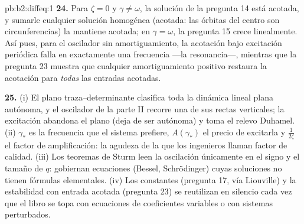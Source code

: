 \begin{solution}{pb:b2:diffeq:1}
\textbf{24.} Para $\zeta = 0$ y $\gamma \neq \omega$, la solución de
la pregunta 14 está acotada, y sumarle cualquier solución homogénea
(acotada: las órbitas del centro son circunferencias) la mantiene
acotada; en $\gamma = \omega$, la pregunta 15 crece linealmente. Así
pues, para el oscilador sin amortiguamiento, la acotación bajo
excitación periódica falla en exactamente una frecuencia ---la
resonancia---, mientras que la pregunta 23 muestra que cualquier
amortiguamiento positivo restaura la acotación para \emph{todas} las
entradas acotadas.

\textbf{25.} (i) El plano traza--determinante clasifica toda la
dinámica lineal plana autónoma, y el oscilador de la parte II recorre
una de sus rectas verticales; la excitación abandona el plano (deja
de ser autónoma) y toma el relevo Duhamel. (ii) $\gamma_*$ es la
frecuencia que el sistema prefiere, $A(\gamma_*)$ el precio de
excitarla y $\frac{1}{2\zeta}$ el factor de amplificación: la agudeza
de la  que los ingenieros llaman factor de calidad. (iii)
Los teoremas de Sturm leen la oscilación únicamente en el signo y el
tamaño de $q$: gobiernan ecuaciones (Bessel, Schrödinger) cuyas
soluciones no tienen fórmulas elementales. (iv) Los
 constantes (pregunta 17, vía Liouville) y la estabilidad
con entrada acotada (pregunta 23) se reutilizan en silencio cada vez
que el libro se topa con ecuaciones de coeficientes variables o con
sistemas perturbados.
\end{solution}
